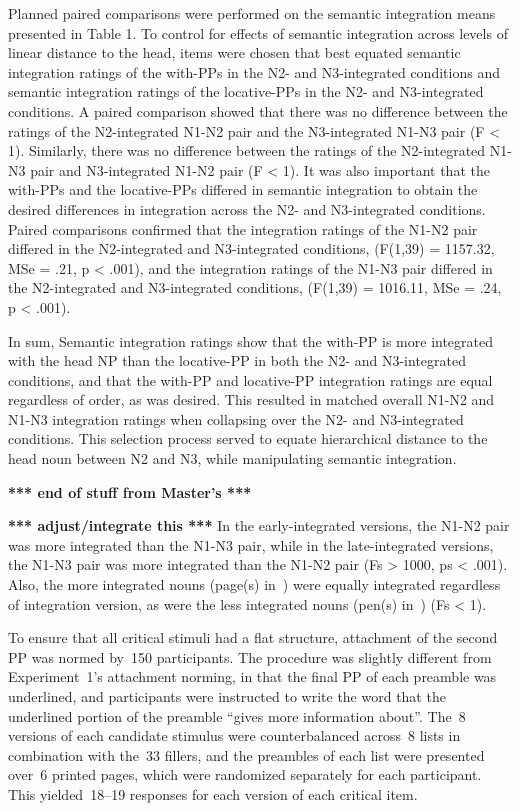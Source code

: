 \documentclass[12pt,titlepage]{article}
\newcommand{\TODO}[1]{\textbf{*** #1 ***}}  %
\newcommand{\NOTE}[1]{\textbf{*** #1 ***}}  %
\newcommand{\IGNORE}[1]{} %
\begin{document}
{Planned paired comparisons were performed on the semantic integration means
presented in Table 1.  To control for effects of semantic integration
across levels of linear distance to the head, items were chosen that best
equated semantic integration ratings of the with-PPs in the N2- and
N3-integrated conditions and semantic integration ratings of the
locative-PPs in the N2- and N3-integrated conditions.  A paired comparison
showed that there was no difference between the ratings of the
N2-integrated N1-N2 pair and the N3-integrated N1-N3 pair (F < 1).
Similarly, there was no difference between the ratings of the N2-integrated
N1-N3 pair and N3-integrated N1-N2 pair (F < 1).  It was also important
that the with-PPs and the locative-PPs differed in semantic integration to
obtain the desired differences in integration across the N2- and
N3-integrated conditions.  Paired comparisons confirmed that the
integration ratings of the N1-N2 pair differed in the N2-integrated and
N3-integrated conditions, (F(1,39) = 1157.32, MSe = .21, p < .001), and the
integration ratings of the N1-N3 pair differed in the N2-integrated and
N3-integrated conditions, (F(1,39) = 1016.11, MSe = .24, p < .001).

In sum,   Semantic integration ratings show
that the with-PP is more integrated with the head NP than the locative-PP
in both the N2- and N3-integrated conditions, and that the with-PP and
locative-PP integration ratings are equal regardless of order, as was
desired.  This resulted in matched overall N1-N2 and N1-N3 integration
ratings when collapsing over the N2- and N3-integrated conditions.  This
selection process served to equate hierarchical distance to the head noun
between N2 and N3, while manipulating semantic integration.

\NOTE{end of stuff from Master's}

\TODO{adjust/integrate this} In the early-integrated versions, the N1-N2
pair was more integrated than the N1-N3 pair, while in the late-integrated
versions, the N1-N3 pair was more integrated than the N1-N2 pair (Fs >
1000, ps < .001).  Also, the more integrated nouns (page(s) in~)
were equally integrated regardless of integration version, as were the less
integrated nouns (pen(s) in~) (Fs < 1).

}

To ensure that all critical stimuli had a flat structure, attachment
of the second PP was normed by~150 participants\IGNORE{ran 152,
dropped one non-native English speaker and one person who answered
with N3 repeatedly}.  The procedure was slightly different from
Experiment~1's attachment norming, in that the final PP of each
preamble was underlined, and participants were instructed to write the
word that the underlined portion of the preamble ``gives more
information about''.  The~8 versions of each candidate stimulus were
counterbalanced across~8 lists in combination with the~33 fillers, and
the preambles of each list were presented over~6 printed pages, which
were randomized separately for each participant.  This yielded~18--19
responses for each version of each critical item.
\end{document}
